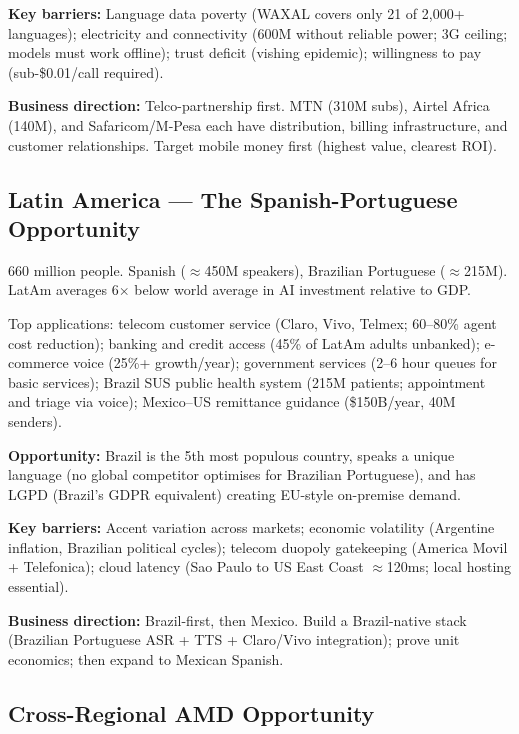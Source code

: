 \documentclass[12pt,a4paper]{article}
\begin{document}
\textbf{Key barriers:} Language data poverty (WAXAL covers only 21 of
2{,}000+ languages); electricity and connectivity (600M without reliable
power; 3G ceiling; models must work offline); trust deficit (vishing
epidemic); willingness to pay (sub-\$0.01/call required).

\textbf{Business direction:} Telco-partnership first.  MTN (310M subs),
Airtel Africa (140M), and Safaricom/M-Pesa each have distribution, billing
infrastructure, and customer relationships.  Target mobile money first
(highest value, clearest ROI).

\subsection{Latin America --- The Spanish-Portuguese Opportunity}

660 million people.  Spanish ($\approx$450M speakers), Brazilian Portuguese
($\approx$215M).  LatAm averages 6$\times$ below world average in AI
investment relative to GDP.

Top applications: telecom customer service (Claro, Vivo, Telmex; 60--80\%
agent cost reduction); banking and credit access (45\% of LatAm adults
unbanked); e-commerce voice (25\%+ growth/year); government services
(2--6 hour queues for basic services); Brazil SUS public health system
(215M patients; appointment and triage via voice); Mexico--US remittance
guidance (\$150B/year, 40M senders).

\textbf{Opportunity:} Brazil is the 5th most populous country, speaks a
unique language (no global competitor optimises for Brazilian Portuguese),
and has LGPD (Brazil's GDPR equivalent) creating EU-style on-premise demand.

\textbf{Key barriers:} Accent variation across markets; economic volatility
(Argentine inflation, Brazilian political cycles); telecom duopoly
gatekeeping (America Movil + Telefonica); cloud latency (Sao Paulo to US
East Coast $\approx$120ms; local hosting essential).

\textbf{Business direction:} Brazil-first, then Mexico.  Build a
Brazil-native stack (Brazilian Portuguese ASR + TTS + Claro/Vivo
integration); prove unit economics; then expand to Mexican Spanish.

\subsection{Cross-Regional AMD Opportunity}
\end{document}
